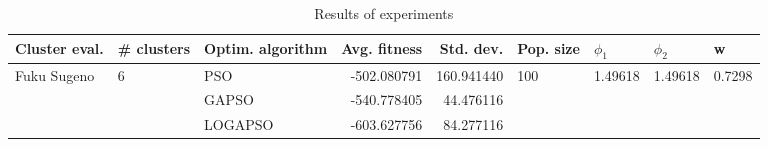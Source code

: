 \begin{table}
\centering
\caption{Results of experiments}
\begin{tabular}{lllrrllll}
\toprule
               Cluster eval. &        \# clusters & Optim. algorithm &  Avg. fitness &  Std. dev. &            Pop. size &               $\phi_{1}$ &               $\phi_{2}$ &                       w \\
\midrule
\multirow{3}{*}{Fuku Sugeno} & \multirow{3}{*}{6} &              PSO &   -502.080791 & 160.941440 & \multirow{3}{*}{100} & \multirow{3}{*}{1.49618} & \multirow{3}{*}{1.49618} & \multirow{3}{*}{0.7298} \\
                             &                    &            GAPSO &   -540.778405 &  44.476116 &                      &                          &                          &                         \\
                             &                    &          LOGAPSO &   -603.627756 &  84.277116 &                      &                          &                          &                         \\
\bottomrule
\end{tabular}
\end{table}
